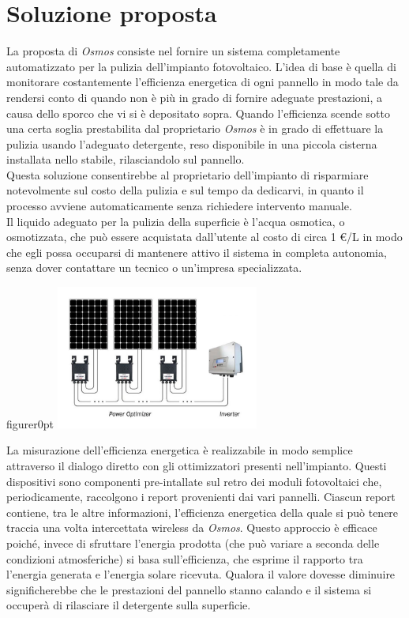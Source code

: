 \documentclass[a4paper, 12pt]{article}
\begin{document}
	\section{Soluzione proposta}
	La proposta di \emph{Osmos} consiste nel fornire un sistema completamente automatizzato per la pulizia dell'impianto fotovoltaico. L'idea di base è quella di monitorare costantemente l'efficienza energetica di ogni pannello in modo tale da rendersi conto di quando non è più in grado di fornire adeguate prestazioni, a causa dello sporco che vi si è depositato sopra. Quando l'efficienza scende sotto una certa soglia prestabilita dal proprietario \emph{Osmos} è in grado di effettuare la pulizia usando l'adeguato detergente, reso disponibile in una piccola cisterna installata nello stabile, rilasciandolo sul pannello.\\
	Questa soluzione consentirebbe al proprietario dell'impianto di risparmiare notevolmente sul costo della pulizia e sul tempo da dedicarvi, in quanto il processo avviene automaticamente senza richiedere intervento manuale.\\
	Il liquido adeguato per la pulizia della superficie è l'acqua osmotica, o osmotizzata, che può essere acquistata dall'utente al costo di circa 1 \euro/L in modo che egli possa occuparsi di mantenere attivo il sistema in completa autonomia, senza dover contattare un tecnico o un'impresa specializzata.\\%
	\begin{wrapfloat}{figure}{r}{0pt}
		\includegraphics[width=0.5\textwidth]{Images/ottimizzatori.jpg}
	\end{wrapfloat}
	La misurazione dell'efficienza energetica è realizzabile in modo semplice attraverso il dialogo diretto con gli ottimizzatori presenti nell'impianto. Questi dispositivi sono componenti pre-intallate sul retro dei moduli fotovoltaici che, periodicamente, raccolgono i report provenienti dai vari pannelli. Ciascun report contiene, tra le altre informazioni, l'efficienza energetica della quale si può tenere traccia una volta intercettata wireless da \emph{Osmos}. Questo approccio è efficace poiché, invece di sfruttare l'energia prodotta (che può variare a seconda delle condizioni atmosferiche) si basa sull'efficienza, che esprime il rapporto tra l'energia generata e l'energia solare ricevuta. Qualora il valore dovesse diminuire significherebbe che le prestazioni del pannello stanno calando e il sistema si occuperà di rilasciare il detergente sulla superficie.
\end{document}
